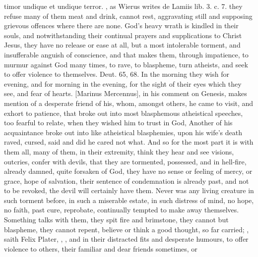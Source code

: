 {{timor undique et undique terror}. , as Wierus writes \textlatin{de Lamiis lib. 3. c. 7.} they refuse
many of them meat and drink, cannot rest, aggravating still and
supposing grievous offences where there are none. God's heavy wrath is
kindled in their souls, and notwithstanding their continual prayers and
supplications to Christ Jesus, they have no release or ease at all, but
a most intolerable torment, and insufferable anguish of conscience, and
that makes them, through impatience, to murmur against God many times,
to rave, to blaspheme, turn atheists, and seek to offer violence to
themselves. Deut.  65, 68. In the morning they wish for evening,
and for morning in the evening, for the sight of their eyes which they
see, and fear of hearts. [Marinus Mercennus], in his comment on
Genesis, makes mention of a desperate friend of his, whom, amongst
others, he came to visit, and exhort to patience, that broke out into
most blasphemous atheistical speeches, too fearful to relate, when they
wished him to trust in God,  Another of his acquaintance broke out
into like atheistical blasphemies, upon his wife's death raved, cursed,
said and did he cared not what. And so for the most part it is with
them all, many of them, in their extremity, think they hear and see
visions, outcries, confer with devils, that they are tormented,
possessed, and in hell-fire, already damned, quite forsaken of God,
they have no sense or feeling of mercy, or grace, hope of salvation,
their sentence of condemnation is already past, and not to be revoked,
the devil will certainly have them. Never was any living creature in
such torment before, in such a miserable estate, in such distress of
mind, no hope, no faith, past cure, reprobate, continually tempted to
make away themselves. Something talks with them, they spit fire and
brimstone, they cannot but blaspheme, they cannot repent, believe or
think a good thought, so far carried; , saith Felix Plater, , \etc{}, and in their distracted fits and desperate humours, to
offer violence to others, their familiar and dear friends sometimes, or
}

